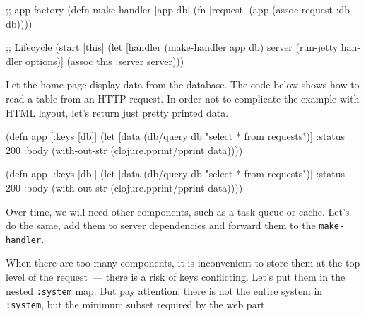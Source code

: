 \else

\begin{english}
  \begin{clojure}
;; app factory
(defn make-handler [app db]
  (fn [request]
    (app (assoc request :db db))))

;; Lifecycle
(start [this]
  (let [handler (make-handler app db)
        server (run-jetty handler options)]
    (assoc this :server server)))
  \end{clojure}
\end{english}

\fi

Let the home page display data from the database. The code below shows how to read a table from an HTTP request. In order not to complicate the example with HTML layout, let's return just pretty printed data.

\ifnarrow

\begin{english}
  \begin{clojure}
(defn app [{:keys [db]}]
  (let [data (db/query db
               "select * from requests")]
    {:status 200
     :body (with-out-str
             (clojure.pprint/pprint
               data))}))
  \end{clojure}
\end{english}

\else

\begin{english}
  \begin{clojure}
(defn app [{:keys [db]}]
  (let [data (db/query db "select * from requests")]
    {:status 200
     :body (with-out-str
             (clojure.pprint/pprint data))}))
  \end{clojure}
\end{english}

\fi

Over time, we will need other components, such as a task queue or cache. Let's do the same, add them to server dependencies and forward them to the \verb|make-handler|.


When there are too many components, it is inconvenient to store them at the top level of the request~--- there is a risk of keys conflicting. Let's put them in the nested \verb|:system| map. But pay attention: there is not the entire system in \verb|:system|, but the minimum subset required by the web part.



